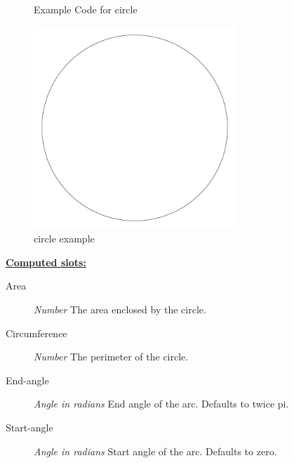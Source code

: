 \documentclass [11pt]{book}
\begin{document}
\begin{itemize}
\begin{figure}
\caption{Example Code for circle}

\label{fig:example-code-circle}

\end{figure}

\begin{figure}
\begin{center}
\includegraphics[width=3in,height=3in]{../images/example-circle.pdf}
\end{center}

\caption{circle example}

\label{fig:circle}

\end{figure}





\textbf{
\underline{Computed slots:}}

\begin{description}

\item [Area]
\emph{Number} The area enclosed by the circle.


\item [Circumference]
\emph{Number} The perimeter of the circle.


\item [End-angle]
\emph{Angle in radians} End angle of the arc. Defaults to twice pi.


\item [Start-angle]
\emph{Angle in radians} Start angle of the arc. Defaults to zero.


\end{description}








\end{itemize}
\end{document}
